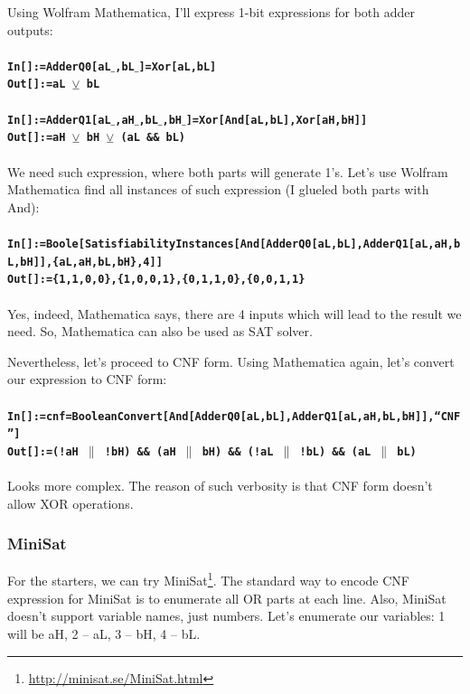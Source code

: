 Using Wolfram Mathematica, I'll express 1-bit expressions for both adder outputs:\\
\\
\textbf{\texttt{In[]:=AdderQ0[aL$\_$,bL$\_$]=Xor[aL,bL]}} \\
\textbf{\texttt{Out[]:=aL $\veebar$ bL}} \\
\\
\textbf{\texttt{In[]:=AdderQ1[aL$\_$,aH$\_$,bL$\_$,bH$\_$]=Xor[And[aL,bL],Xor[aH,bH]]}} \\
\textbf{\texttt{Out[]:=aH $\veebar$ bH $\veebar$ (aL \&\& bL)}} \\
\\
We need such expression, where both parts will generate 1's.
Let's use Wolfram Mathematica find all instances of such expression (I glueled both parts with And): \\
\\
\textbf{\texttt{In[]:=Boole[SatisfiabilityInstances[And[AdderQ0[aL,bL],AdderQ1[aL,aH,bL,bH]],\{aL,aH,bL,bH\},4]]}} \\
\textbf{\texttt{Out[]:=\{1,1,0,0\},\{1,0,0,1\},\{0,1,1,0\},\{0,0,1,1\}}} \\
\\
Yes, indeed, Mathematica says, there are 4 inputs which will lead to the result we need.
So, Mathematica can also be used as SAT solver.

Nevertheless, let's proceed to CNF form. Using Mathematica again, let's convert our expression to CNF form:\\
\\
\textbf{\texttt{In[]:=cnf=BooleanConvert[And[AdderQ0[aL,bL],AdderQ1[aL,aH,bL,bH]],``CNF'']}} \\
\textbf{\texttt{Out[]:=(!aH $\|$ !bH) \&\& (aH $\|$ bH) \&\& (!aL $\|$ !bL) \&\& (aL $\|$ bL)}} \\
\\
Looks more complex. The reason of such verbosity is that CNF form doesn't allow XOR operations.

\subsubsection{MiniSat}

For the starters, we can try MiniSat\footnote{\url{http://minisat.se/MiniSat.html}}.
The standard way to encode CNF expression for MiniSat is to enumerate all OR parts at each line.
Also, MiniSat doesn't support variable names, just numbers.
Let's enumerate our variables: 1 will be aH, 2 -- aL, 3 -- bH, 4 -- bL.

